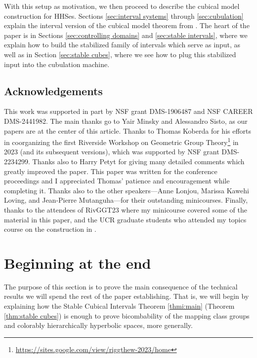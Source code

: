 \documentclass{amsart}
\theoremstyle{definition}
\theoremstyle{remark}
\theoremstyle{definition}
\begin{document}
With this setup as motivation, we then proceed to describe the cubical model construction for HHSes.  Sections \ref{sec:interval systems} through \ref{sec:cubulation} explain the interval version of the cubical model theorem from \cite{Dur_infcube}.  The heart of the paper is in Sections \ref{sec:controlling domains} and \ref{sec:stable intervals}, where we explain how to build the stabilized family of intervals which serve as input, as well as in Section \ref{sec:stable cubes}, where we see how to plug this stabilized input into the cubulation machine.
 
\subsection{Acknowledgements}

This work was supported in part by NSF grant DMS-1906487 and NSF CAREER DMS-2441982.  The main thanks go to Yair Minsky and Alessandro Sisto, as our papers \cite{DMS_bary, DMS_FJ} are at the center of this article.  Thanks to Thomas Koberda for his efforts in coorganizing the first Riverside Workshop on Geometric Group Theory\footnote{\url{https://sites.google.com/view/riggthew-2023/home}} in 2023 (and its subsequent versions), which was supported by NSF grant DMS-2234299.  Thanks also to Harry Petyt for giving many detailed comments which greatly improved the paper.  This paper was written for the conference proceedings and I appreciated Thomas' patience and encouragement while completing it.  Thanks also to the other speakers---Anne Lonjou, Marissa Kawehi Loving, and Jean-Pierre Mutanguha---for their outstanding minicourses.  Finally, thanks to the attendees of RivGGT23 where my minicourse covered some of the material in this paper, and the UCR graduate students who attended my topics course on the construction in \cite{Dur_infcube}.




\section{Beginning at the end} \label{sec:endgame}

The purpose of this section is to prove the main consequence of the technical results we will spend the rest of the paper establishing.  That is, we will begin by explaining how the Stable Cubical Intervals Theorem \ref{thmi:main}  (Theorem \ref{thm:stable cubes}) is enough to prove bicombability of the mapping class groups and colorably hierarchically hyperbolic spaces, more generally.
\end{document}
